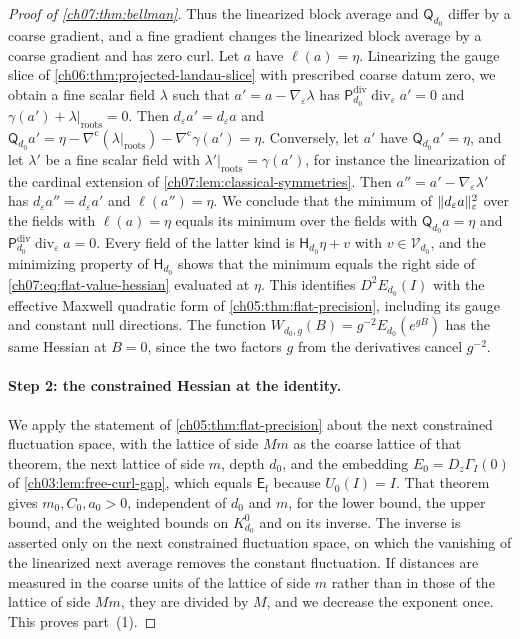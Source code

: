 \begin{proof}[Proof of \cref{ch07:thm:bellman}]
Thus the linearized block average and $\mathsf Q_{d_0}$ differ by a coarse gradient, and a fine gradient changes the linearized block average by a coarse gradient and has zero curl. Let $a$ have $\ell(a)=\eta$. Linearizing the gauge slice of \cref{ch06:thm:projected-landau-slice} with prescribed coarse datum zero, we obtain a fine scalar field $\lambda$ such that $a'=a-\nabla_\varepsilon\lambda$ has $\mathsf P_{d_0}^{\mathrm{div}}\operatorname{div}_\varepsilon a'=0$ and $\gamma(a')+\lambda|_{\mathrm{roots}}=0$. Then $d_\varepsilon a'=d_\varepsilon a$ and $\mathsf Q_{d_0}a'=\eta-\nabla^{\mathrm c}(\lambda|_{\mathrm{roots}})-\nabla^{\mathrm c}\gamma(a')=\eta$. Conversely, let $a'$ have $\mathsf Q_{d_0}a'=\eta$, and let $\lambda'$ be a fine scalar field with $\lambda'|_{\mathrm{roots}}=\gamma(a')$, for instance the linearization of the cardinal extension of \cref{ch07:lem:classical-symmetries}. Then $a''=a'-\nabla_\varepsilon\lambda'$ has $d_\varepsilon a''=d_\varepsilon a'$ and $\ell(a'')=\eta$. We conclude that the minimum of $\lVert d_\varepsilon a\rVert_\varepsilon^2$ over the fields with $\ell(a)=\eta$ equals its minimum over the fields with $\mathsf Q_{d_0}a=\eta$ and $\mathsf P_{d_0}^{\mathrm{div}}\operatorname{div}_\varepsilon a=0$. Every field of the latter kind is $\mathsf H_{d_0}\eta+v$ with $v\in\mathcal V_{d_0}$, and the minimizing property of $\mathsf H_{d_0}$ shows that the minimum equals the right side of \eqref{ch07:eq:flat-value-hessian} evaluated at $\eta$. This identifies $D^2E_{d_0}(I)$ with the effective Maxwell quadratic form of \cref{ch05:thm:flat-precision}, including its gauge and constant null directions. The function $W_{d_0,g}(B)=g^{-2}E_{d_0}(e^{gB})$ has the same Hessian at $B=0$, since the two factors $g$ from the derivatives cancel $g^{-2}$.

\paragraph{Step 2: the constrained Hessian at the identity.}
We apply the statement of \cref{ch05:thm:flat-precision} about the next constrained fluctuation space, with the lattice of side $Mm$ as the coarse lattice of that theorem, the next lattice of side $m$, depth $d_0$, and the embedding $E_0=D_z\Gamma_I(0)$ of \cref{ch03:lem:free-curl-gap}, which equals $\mathsf E_{\mathrm f}$ because $U_0(I)=I$. That theorem gives $m_0,C_0,a_0>0$, independent of $d_0$ and $m$, for the lower bound, the upper bound, and the weighted bounds on $K_{d_0}^0$ and on its inverse. The inverse is asserted only on the next constrained fluctuation space, on which the vanishing of the linearized next average removes the constant fluctuation. If distances are measured in the coarse units of the lattice of side $m$ rather than in those of the lattice of side $Mm$, they are divided by $M$, and we decrease the exponent once. This proves part~(1).


\end{proof}
